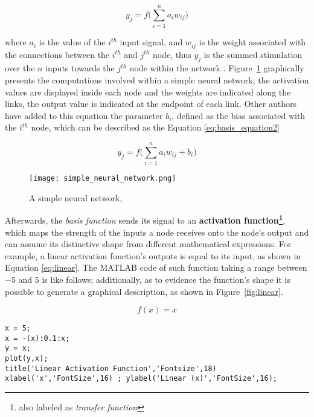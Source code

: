 \documentclass{WileySev}
\begin{document}
\begin{equation}
y_{j}=f\Big(\sum_{i=1}^n a_i w_{ij} \Big) \label{eq:1} %
\end{equation}

where $a_i$ is the value of the $i^{th}$ input signal, and $w_{ij}$ is the weight associated with the connections between the $i^{th}$ and $j^{th}$ node, thus $y_j$ is the summed stimulation over the $n$ inputs towards the $j^{th}$ node within the network \cite[chap. 7]{friedenberg2011cognitive}. Figure~\ref{fig:neural network} graphically presents the computations involved within a simple neural network; the activation values are displayed inside each node and the weights are indicated along the links, the output value is indicated at the endpoint of each link. Other authors \cite{jiang2010medical,tsoukalas1996fuzzy} have added to this equation the parameter $b_i$, defined as the bias associated with the $i^{th}$ node, which can be described as the Equation \ref{eq:basis_equation2}

\begin{equation}
y_j=f\Big( \sum_{i=1}^n a_i w_{ij} +b_i\Big) \label{eq:basis_equation2} %
\end{equation}

\begin{figure}
  \texttt{[image: simple\_neural\_network.png]}
  \centering
  \caption{A simple neural network, \cite{friedenberg2011cognitive}}
  \label{fig:neural network}
\end{figure}

Afterwards, the \textit{basis function} sends its signal to an \textbf{activation function\footnote{also labeled as \textit{transfer function}}}, which maps the strength of the inputs a node receives onto the node's output and can assume its distinctive shape from different mathematical expressions. For example, a linear activation function's outputs is equal to its input, as shown in Equation \ref{eq:linear}. The MATLAB code of such function taking a range between $-5$ and $5$ is like follows; additionally, as to evidence the function's shape it is possible to generate a graphical description, as shown in Figure~\ref{fig:linear}.

\begin{equation}
f(x)=x \label{eq:linear}
\end{equation}

\begin{lstlisting}
x = 5;
x = -(x):0.1:x;
y = x;
plot(y,x);
title('Linear Activation Function','Fontsize',18)
xlabel('x','FontSize',16) ; ylabel('Linear (x)','FontSize',16);
\end{lstlisting}
\end{document}
